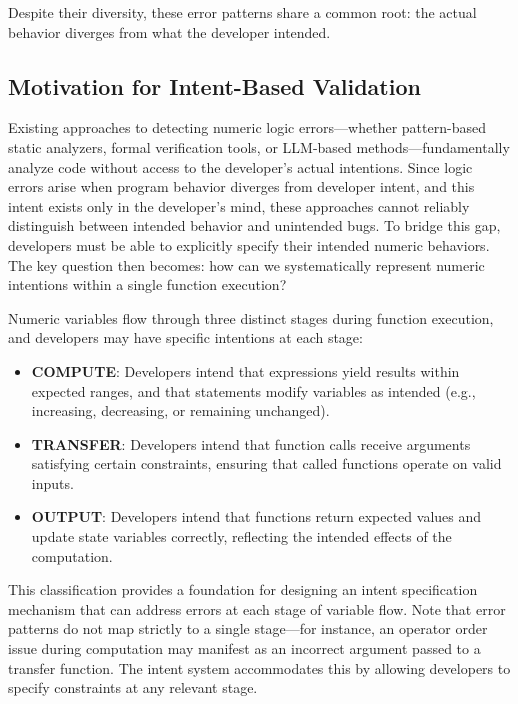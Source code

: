 \documentclass[pdflatex,sn-basic]{sn-jnl}%
\theoremstyle{thmstyleone}%
\theoremstyle{thmstyletwo}%
\theoremstyle{thmstylethree}%
\begin{document}
Despite their diversity, these error patterns share a common root: the actual behavior diverges from what the developer intended.

\subsection{Motivation for Intent-Based Validation}


Existing approaches to detecting numeric logic errors---whether pattern-based static analyzers, formal verification tools, or LLM-based methods---fundamentally analyze code without access to the developer's actual intentions.
Since logic errors arise when program behavior diverges from developer intent, and this intent exists only in the developer's mind, these approaches cannot reliably distinguish between intended behavior and unintended bugs.
To bridge this gap, developers must be able to explicitly specify their intended numeric behaviors.
The key question then becomes: how can we systematically represent numeric intentions within a single function execution?

Numeric variables flow through three distinct stages during function execution, and developers may have specific intentions at each stage:

\begin{itemize}
    \item \textbf{COMPUTE}: Developers intend that expressions yield results within expected ranges, and that statements modify variables as intended (e.g., increasing, decreasing, or remaining unchanged).

    \item \textbf{TRANSFER}: Developers intend that function calls receive arguments satisfying certain constraints,
    ensuring that called functions operate on valid inputs.

    \item \textbf{OUTPUT}: Developers intend that functions return expected values and update state variables correctly,
    reflecting the intended effects of the computation.
\end{itemize}

This classification provides a foundation for designing an intent specification mechanism that can address errors at each stage of variable flow.
Note that error patterns do not map strictly to a single stage---for instance, an operator order issue during computation may manifest as an incorrect argument passed to a transfer function.
The intent system accommodates this by allowing developers to specify constraints at any relevant stage.
\end{document}
